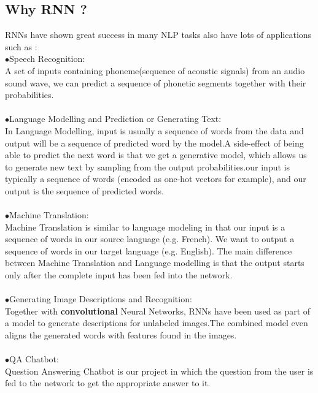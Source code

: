 \subsection{Why RNN ?}
RNNs have shown great success in many NLP tasks also have lots of applications such as :\\
\indent$\bullet$\hspace{5pt}Speech Recognition:\\
A set of inputs containing phoneme(sequence of acoustic signals) from an audio sound wave, we can predict a sequence of phonetic segments together with their probabilities.\\\\
\indent$\bullet$\hspace{5pt}Language Modelling and Prediction or  Generating Text:\\
In Language Modelling, input is usually a sequence of words from the data and output will be a sequence of predicted word by the model.A side-effect of being able to predict the next word is that we get a generative model, which allows us to generate new text by sampling from the output probabilities.our input is typically a sequence of words (encoded as one-hot vectors for example), and our output is the sequence of predicted words.\\\\
\indent$\bullet$\hspace{5pt}Machine Translation:\\
Machine Translation is similar to language modeling in that our input is a sequence of words in our source language (e.g. French). We want to output a sequence of words in our target language (e.g. English).
The main difference between Machine Translation and Language modelling is that the output starts only after the complete input has been fed into the network.\\\\
\indent$\bullet$\hspace{5pt}Generating Image Descriptions and Recognition:\\
Together with \textbf{convolutional} Neural Networks, RNNs have been used as part of a model to generate descriptions for unlabeled images.The combined model even aligns the generated words with features found in the images.\\\\
\indent$\bullet$\hspace{5pt}QA Chatbot:\\
Question Answering Chatbot is our project in which  the question from the user is fed to the network to get the appropriate answer to it. \\\\
